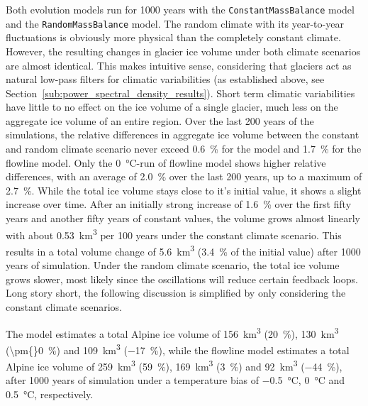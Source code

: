     Both evolution models run for 1000 years with the \lstinline`ConstantMassBalance` model and the \lstinline`RandomMassBalance` model. The random climate with its year-to-year fluctuations is obviously more physical than the completely constant climate. However, the resulting changes in glacier ice volume under both climate scenarios are almost identical. This makes intuitive sense, considering that glaciers act as natural low-pass filters for climatic variabilities (as established above, see Section~\ref{sub:power_spectral_density_results}). Short term climatic variabilities have little to no effect on the ice volume of a single glacier, much less on the aggregate ice volume of an entire region. Over the last 200 years of the simulations, the relative differences in aggregate ice volume between the constant and random climate scenario never exceed \SI{0.6}{\percent} for the \vas{} model and \SI{1.7}{\percent} for the flowline model. Only the \SI{0}{\celsius}-run of flowline model shows higher relative differences, with an average of \SI{2.0}{\percent} over the last 200 years, up to a maximum of \SI{2.7}{\percent}. While the total ice volume stays close to it's initial value, it shows a slight increase over time. After an initially strong increase of \SI{1.6}{\percent} over the first fifty years and another fifty years of constant values, the volume grows almost linearly with about \SI{0.53}{\cubic\kilo\meter} per 100 years under the constant climate scenario. This results in a total volume change of \SI{5.6}{\cubic\kilo\meter} (\SI{+3.4}{\percent} of the initial value) after 1000 years of simulation. Under the random climate scenario, the total ice volume grows slower, most likely since the oscillations will reduce certain feedback loops. Long story short, the following discussion is simplified by only considering the constant climate scenarios. 

    The \vas{} model estimates a total Alpine ice volume of \SI{156}{\cubic\kilo\meter} (\SI{+20}{\percent}), \SI{130}{\cubic\kilo\meter} (\SI{\pm{}0}{\percent}) and \SI{109}{\cubic\kilo\meter} (\SI{-17}{\percent}), while the flowline model estimates a total Alpine ice volume of \SI{259}{\cubic\kilo\meter} (\SI{+59}{\percent}), \SI{169}{\cubic\kilo\meter} (\SI{+3}{\percent}) and \SI{92}{\cubic\kilo\meter} (\SI{-44}{\percent}), after 1000 years of simulation under a temperature bias of \SI{-0.5}{\celsius}, \SI{0}{\celsius} and \SI{+0.5}{\celsius}, respectively.

